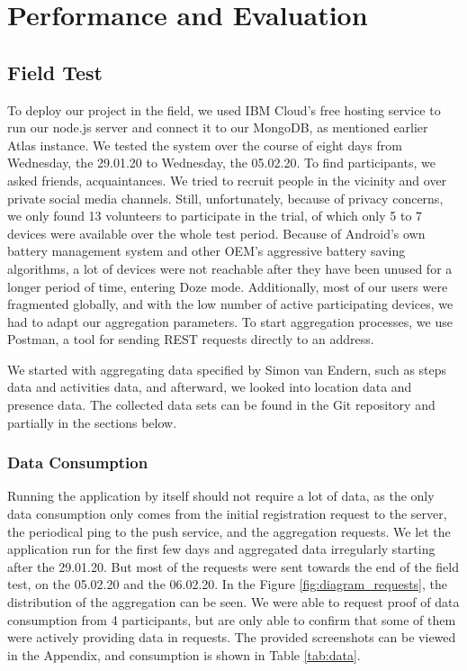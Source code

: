 
\chapter{Performance and Evaluation}\label{chapter:evaluation}
\section{Field Test}\label{sec:field_test}
To deploy our project in the field, we used IBM Cloud's free hosting service to run our node.js server and connect it to our MongoDB, as mentioned earlier Atlas instance. We tested the system over the course of eight days from Wednesday, the 29.01.20 to Wednesday, the 05.02.20. To find participants, we asked friends, acquaintances. We tried to recruit people in the vicinity and over private social media channels. Still, unfortunately, because of privacy concerns, we only found 13 volunteers to participate in the trial, of which only 5 to 7 devices were available over the whole test period. Because of Android's own battery management system and other OEM's aggressive battery saving algorithms, a lot of devices were not reachable after they have been unused for a longer period of time, entering Doze mode. Additionally, most of our users were fragmented globally, and with the low number of active participating devices, we had to adapt our aggregation parameters. To start aggregation processes, we use Postman,
a tool for sending REST requests directly to an address.

We started with aggregating data specified by Simon van Endern, such as steps data and activities data, and afterward, we looked into location data and presence data. The collected data sets can be found in the Git repository
and partially in the sections below.

\subsection{Data Consumption}
Running the application by itself should not require a lot of data, as the only data consumption only comes from the initial registration request to the server, the periodical ping to the push service, and the aggregation requests. We let the application run for the first few days and aggregated data irregularly starting after the 29.01.20. But most of the requests were sent towards the end of the field test, on the 05.02.20 and the 06.02.20. In the Figure \ref{fig:diagram_requests}, the distribution of the aggregation can be seen. We were able to request proof of data consumption from 4 participants, but are only able to confirm that some of them were actively providing data in requests. The provided screenshots can be viewed in the Appendix, and consumption is shown in Table \ref{tab:data}. 

